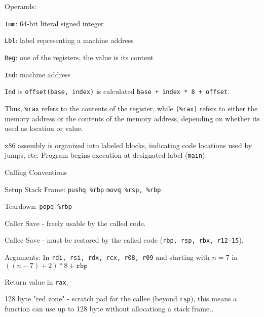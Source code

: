 Operands:
\begin{compactitem}[$\quad\bullet$]
	\item \texttt{Imm}: 64-bit literal signed integer
	\item \texttt{Lbl}: label representing a machine address
	\item \texttt{Reg}: one of the registers, the value is its content
	\item \texttt{Ind}: machine address
\end{compactitem} \medskip

\texttt{Ind} is  \texttt{offset(base, index)} is calculated \texttt{base + index * 8 + offset}.\medskip

Thus, \texttt{\%rax} refers to the contents of the register, while \texttt{(\%rax)} refers to either the memory address or the contents of the memory address, depending on whether its used as location or value.\medskip

x86 assembly is organized into labeled blocks, indicating code locations used by jumps, etc. Program begins execution at designated label (\texttt{main}).\medskip

Calling Conventions
\begin{compactitem}[$\quad\bullet$]
	\item Setup Stack Frame: \texttt{pushq \%rbp} \quad \texttt{movq \%rsp, \%rbp}

	\item Teardown: \texttt{popq \%rbp}

	\item Caller Save - freely usable by the called code.

	\item Callee Save - must be restored by the called code (\texttt{rbp, rsp, rbx, r12-15}).

	\item Arguments: In \texttt{rdi, rsi, rdx, rcx, r08, r09} and starting with $n = 7$ in $((n-7) + 2) * 8 + \texttt{rbp}$

	\item Return value in \texttt{rax}.

	\item 128 byte "red zone" - scratch pad for the callee (beyond \texttt{rsp}), this means a function can use up to 128 byte without allocationg a stack frame..
\end{compactitem}

